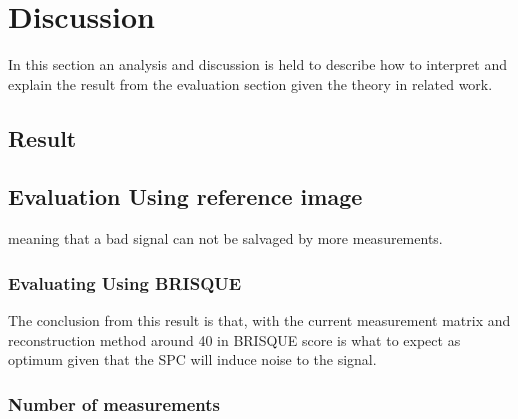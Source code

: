\section{Discussion}
In this section an analysis and discussion is held to describe how to interpret and explain the result from the evaluation section given the theory in related work.

\subsection{Result} 


\subsection{Evaluation Using reference image}
meaning that a bad signal can not be salvaged by more measurements.



\subsubsection{Evaluating Using BRISQUE}
The conclusion from this result is that, with the current measurement matrix and reconstruction method around 40 in BRISQUE score is what to expect as optimum given that the SPC will induce noise to the signal. 

\subsubsection{Number of measurements}

